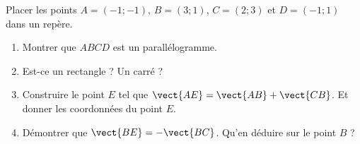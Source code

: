 
\begin{exercice}\label{exosmath-0591}

    Placer les points \( A=(-1;-1)\), \( B=(3;1)\), \( C=(2;3)\) et \( D=(-1;1)\) dans un repère.
    \begin{enumerate}
        \item
            Montrer que \( ABCD\) est un parallélogramme.
        \item
            Est-ce un rectangle ? Un carré ?
        \item
            Construire le point \( E\) tel que \( \vect{ AE }=\vect{ AB }+\vect{ CB }\). Et donner les coordonnées du point \( E\).
        \item
            Démontrer que \( \vect{ BE}=-\vect{ BC } \). Qu'en déduire sur le point \( B\) ?
    \end{enumerate}

\end{exercice}
